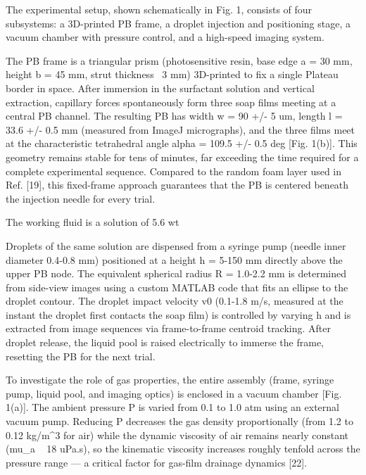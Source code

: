 The experimental setup, shown schematically in Fig. 1, consists of four subsystems: a 3D-printed PB frame, a droplet injection and positioning stage, a vacuum chamber with pressure control, and a high-speed imaging system.

The PB frame is a triangular prism (photosensitive resin, base edge a = 30 mm, height b = 45 mm, strut thickness ~3 mm) 3D-printed to fix a single Plateau border in space. After immersion in the surfactant solution and vertical extraction, capillary forces spontaneously form three soap films meeting at a central PB channel. The resulting PB has width w = 90 +/- 5 um, length l = 33.6 +/- 0.5 mm (measured from ImageJ micrographs), and the three films meet at the characteristic tetrahedral angle alpha = 109.5 +/- 0.5 deg [Fig. 1(b)]. This geometry remains stable for tens of minutes, far exceeding the time required for a complete experimental sequence. Compared to the random foam layer used in Ref. [19], this fixed-frame approach guarantees that the PB is centered beneath the injection needle for every trial.

The working fluid is a solution of 5.6 wt%

Droplets of the same solution are dispensed from a syringe pump (needle inner diameter 0.4-0.8 mm) positioned at a height h = 5-150 mm directly above the upper PB node. The equivalent spherical radius R = 1.0-2.2 mm is determined from side-view images using a custom MATLAB code that fits an ellipse to the droplet contour. The droplet impact velocity v0 (0.1-1.8 m/s, measured at the instant the droplet first contacts the soap film) is controlled by varying h and is extracted from image sequences via frame-to-frame centroid tracking. After droplet release, the liquid pool is raised electrically to immerse the frame, resetting the PB for the next trial.

To investigate the role of gas properties, the entire assembly (frame, syringe pump, liquid pool, and imaging optics) is enclosed in a vacuum chamber [Fig. 1(a)]. The ambient pressure P is varied from 0.1 to 1.0 atm using an external vacuum pump. Reducing P decreases the gas density proportionally (from 1.2 to 0.12 kg/m^3 for air) while the dynamic viscosity of air remains nearly constant (mu_a ~ 18 uPa.s), so the kinematic viscosity increases roughly tenfold across the pressure range — a critical factor for gas-film drainage dynamics [22].


